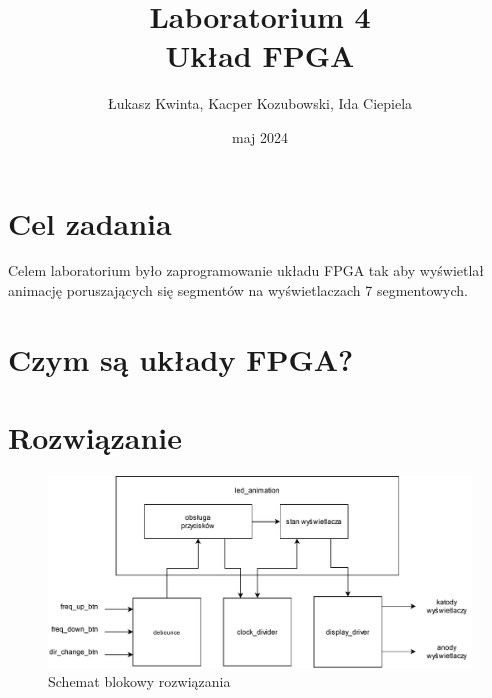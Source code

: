 \documentclass[a4paper]{article}
\title{\fontsize{30pt}{30pt}\selectfont Laboratorium 4 \\ Układ FPGA}
\author{\fontsize{20pt}{20pt}\selectfont Łukasz Kwinta, Kacper Kozubowski, Ida Ciepiela}
\date{maj 2024}
\begin{document}
\maketitle
\pagebreak
\large
\tableofcontents

\pagebreak
\section{Cel zadania}
\Large
Celem laboratorium było zaprogramowanie układu FPGA tak aby wyświetlał animację poruszających się 
segmentów na wyświetlaczach 7 segmentowych. 

\section{Czym są układy FPGA?}

\section{Rozwiązanie}
\begin{figure}[H]
    \centering
    \includegraphics[width=\textwidth]{led_animation.drawio.pdf}
    \caption{Schemat blokowy rozwiązania}
\end{figure}
\end{document}
